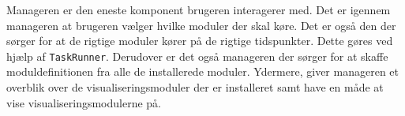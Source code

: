 Manageren er den eneste komponent brugeren interagerer med.
Det er igennem manageren at brugeren vælger hvilke moduler der skal køre.
Det er også den der sørger for at de rigtige moduler kører på de rigtige tidspunkter.
Dette gøres ved hjælp af \texttt{TaskRunner}.
Derudover er det også manageren der sørger for at skaffe moduldefinitionen fra alle de installerede moduler.
Ydermere, giver manageren et overblik over de visualiseringsmoduler der er installeret samt have en måde at vise visualiseringsmodulerne på.